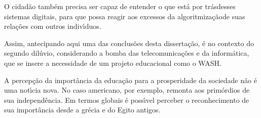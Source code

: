 \documentclass[
12pt,		%
openright,	%
twoside,  %
a4paper,			%
chapter=TITLE,		%
english,			%
french,				%
spanish,			%
brazil				%
]{USPSC-classe/USPSC}
\begin{document}
O cidad\~ao tamb\'em precisa ser capaz de entender \textquotedbl o que est\'a por tr\'as\textquotedbl  desses sistemas digitais, para que possa reagir aos excessos da \textquotedbl algoritmiza\c{c}\~ao\textquotedbl  de suas rela\c{c}\~oes com outros indiv\'{\i}duos.

















Assim, antecipando aqui uma das conclus\~oes desta disserta\c{c}\~ao, \'e no contexto do \textquotedbl segundo dil\'uvio\textquotedbl , considerando a bomba das telecomunica\c{c}\~oes e da inform\'atica, que se insere a necessidade de um projeto educacional como o WASH.

















A percep\c{c}\~ao da import\^ancia da educa\c{c}\~ao para a prosperidade da sociedade n\~ao \'e uma not\'{\i}cia nova. No caso americano, por exemplo, remonta aos prim\'ordios de sua independ\^encia. Em termos globais \'e poss\'{\i}vel perceber o reconhecimento de sua import\^ancia desde a gr\'ecia e do Egito antigos.
\end{document}
